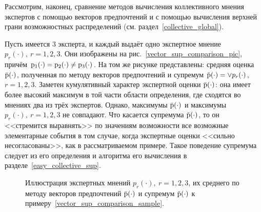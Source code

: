 Рассмотрим, наконец, сравнение методов вычисления коллективного мнения экспертов с помощью векторов предпочтений и с помощью вычисления верхней грани возможностных распределений (см. раздел~\ref{collective_global}).
\begin{example}
\label{vector_sup_comparison_sample}
Пусть имеется $3$ эксперта, и каждый выдаёт одно экспертное мнение $p_r(\cdot),\ r=1,2,3$. Они изображены на рис.~\ref{vector_sup_comparison_pic}, причём ${\mathrm{p}}_1(\cdot) = {\mathrm{p}}_2(\cdot) \neq {\mathrm{p}}_3(\cdot)$. На том же рисунке представлены: средняя оценка $\bar{{\mathrm{p}}}(\cdot)$, полученная по методу векторов предпочтений и супремум $\check{{\mathrm{p}}}(\cdot) = \vee p_r(\cdot)$, $r=1,2,3$. Заметен кумулятивный характер экспертной оценки $\bar{{\mathrm{p}}}(\cdot)$: она имеет более высокий максимум в той части области определения, где сходятся во мнениях два из трёх экспертов. Однако, максимумы $\bar{{\mathrm{p}}}(\cdot)$ и максимумы $p_r(\cdot),\ r=1,2,3$ не совпадают. Что касается супремума $\check{{\mathrm{p}}}(\cdot)$, то он <<стремится выравнять>> по значениям возможности все возможные элементарные события в том случае, когда экспертные оценки <<сильно несогласованы>>, как в рассматриваемом примере. Такое поведение супремума следует из его определения и алгоритма его вычисления в разделе~\ref{easy_collective_sup}.  
\end{example}

\begin{figure}[h]
\caption{\small Иллюстрация экспертных мнений $p_r(\cdot),\ r=1,2,3$, их среднего по методу векторов предпочтений $\bar{{\mathrm{p}}}(\cdot)$ и супремум $\check{{\mathrm{p}}}(\cdot)$ к примеру~\ref{vector_sup_comparison_sample}.}
\label{ris:expert_sample}
\end{figure}

